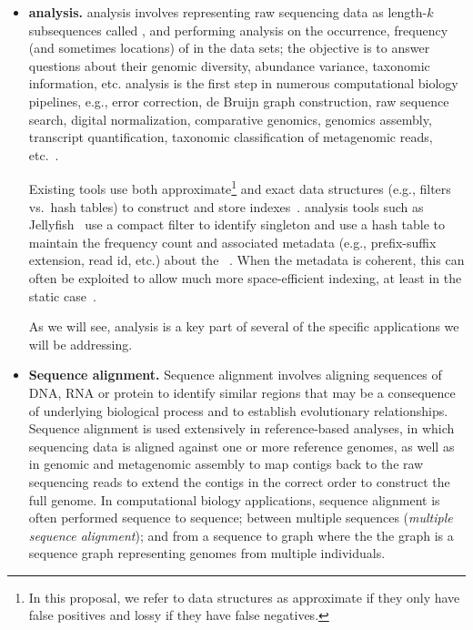 \begin{itemize}[leftmargin=*]
\item \textbf{\Kmer analysis.}
\Kmer analysis involves representing raw sequencing data as length-$k$ subsequences called \kmers, and performing analysis on the occurrence, frequency (and sometimes locations) of \kmers in the data sets; the objective is to answer questions about their genomic diversity, abundance variance, taxonomic information, etc. \Kmer analysis is the first step in numerous computational biology pipelines, e.g., error correction, de Bruijn graph construction, raw sequence search, digital normalization, comparative genomics, genomics assembly, transcript quantification, taxonomic classification of metagenomic reads, etc.~\cite{wood2014kraken,GeorganasEHG18,hofmeyr2020terabase,solomon2016fast,PatroSailfish:2014,PandeyABFJP18Cell,PandeyBJP17a,PandeyBJP17b}.

Existing tools use both  approximate\footnote{In this proposal, we refer to data structures as approximate if they only have false positives and lossy if they have false negatives.} and exact data structures (e.g., filters vs.\ hash tables) to construct and store \kmer indexes~\cite{MarccaisKi11,PandeyBJP17a}.  \Kmer analysis tools such as  Jellyfish~\cite{MarccaisKi11} use a compact filter to identify singleton \kmers and use a hash table to maintain the frequency count and associated metadata (e.g., prefix-suffix extension, read id, etc.) about the \kmers~\cite{hofmeyr2020terabase}. When the metadata is coherent, this can often be exploited to allow much more space-efficient indexing, at least in the static case~\cite{pibiri2022sparse,pibiri2023weighted,fan2023spt,fan2023fulgor}.

As we will see, \kmer analysis is a key part of several of the specific applications we will be addressing.


\item \textbf{Sequence alignment.} Sequence alignment involves aligning sequences of DNA, RNA or protein to identify similar regions that may be a consequence of underlying biological process and to establish evolutionary relationships.
Sequence alignment is used extensively in reference-based analyses, in which sequencing data is aligned against one or more reference genomes, as well as in genomic and metagenomic assembly to map contigs back to the raw sequencing reads to extend the contigs in the correct order to construct the full genome. In computational biology applications, sequence alignment is often performed sequence to sequence; between multiple sequences (\emph{multiple sequence alignment}); and from a sequence to graph where the the graph is a sequence graph representing genomes from multiple individuals.


\end{itemize}
